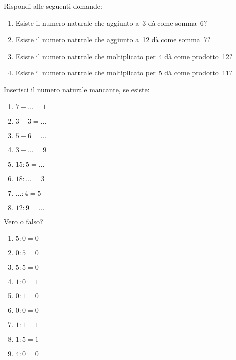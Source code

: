 \begin{esercizio}
Rispondi alle seguenti domande:
 \begin{enumerate}[noitemsep, label=(\alph*)]
 \item Esiste il numero naturale che aggiunto a~3 dà come somma~6?
 \item Esiste il numero naturale che aggiunto a~12 dà come somma~7?
 \item Esiste il numero naturale che moltiplicato per~4 dà come prodotto~12?
 \item Esiste il numero naturale che moltiplicato per~5 dà come prodotto~11?
 \end{enumerate}
\end{esercizio}

\begin{esercizio}
 Inserisci il numero naturale mancante, se esiste:
\begin{multicols}{4}
\begin{enumerate}[noitemsep, label=(\alph*)]
 \item \(7-\ldots =1\) \qquad
 \item\(3-3=\ldots~\) \qquad
 \item\(5-6=\ldots~\) \qquad
 \item \(3-\ldots =9\) \qquad
 \item\(15:5=\ldots~\) \qquad
 \item\(18:\ldots =3\) \qquad
 \item \(\ldots:4=5\) \qquad
 \item\(12:9=\ldots~\) 
\end{enumerate}
\end{multicols}
\end{esercizio}

\begin{esercizio}
 Vero o falso?
\begin{multicols}{3}
\begin{enumerate}[noitemsep, label=(\alph*)]
 \item \(5:0=0\)	\tab\boxV\quad\boxF
 \item \(0:5=0\)	\tab\boxV\quad\boxF
 \item \(5:5=0\)	\tab\boxV\quad\boxF
 \item \(1:0=1\)	\tab\boxV\quad\boxF
 \item \(0:1=0\)	\tab\boxV\quad\boxF
 \item \(0:0=0\)	\tab\boxV\quad\boxF
 \item \(1:1=1\)	\tab\boxV\quad\boxF
 \item \(1:5=1\)	\tab\boxV\quad\boxF
 \item \(4:0=0\)  \tab\boxV\quad\boxF
\end{enumerate}
\end{multicols}
\end{esercizio}

